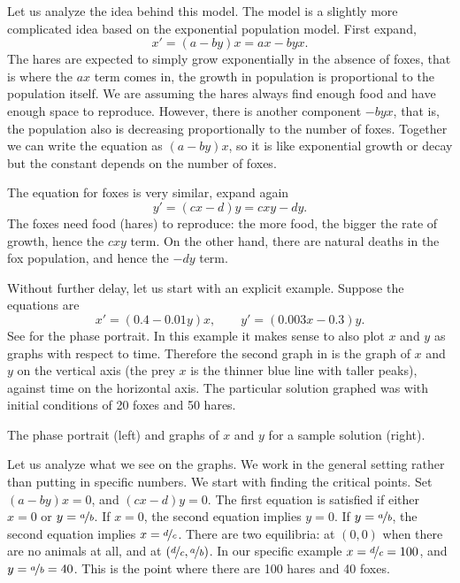 Let us analyze the idea behind this model.  The model is a slightly more
complicated idea based on the exponential population model.
First expand,
\begin{equation*}
x' = (a-by)x = ax - byx .
\end{equation*}
The hares are expected to simply grow exponentially in the absence of foxes,
that is where the $ax$ term comes in, the growth in population is
proportional to the population itself.  We are assuming the hares
always find enough food and have enough space to reproduce.  However,
there is another component $-byx$, that is, the population also is
decreasing proportionally to the number of foxes.  Together we can write the
equation as $(a-by)x$, so it is like exponential growth or decay but the
constant depends on the number of foxes.

The equation for foxes is very similar, expand again
\begin{equation*}
y' = (cx-d)y = cxy-dy .
\end{equation*}
The foxes need food (hares) to reproduce: the more food, the bigger the
rate of growth, hence the $cxy$ term.  On the other hand, there are 
natural deaths in the fox population, and hence the $-dy$ term.

Without further delay, let us start with an explicit example.  Suppose the
equations are 
\begin{equation*}
x' = (0.4-0.01y)x, \qquad y' = (0.003x-0.3)y .
\end{equation*}
See  for the phase portrait.  In this example
it makes sense to also plot $x$ and $y$ as graphs with respect to time.
Therefore the second graph in 
 is the graph of $x$ and $y$ on the vertical
axis (the prey $x$ is the thinner blue line with taller peaks), against time
on the horizontal axis.  The particular solution graphed was with initial
conditions of 20 foxes and 50 hares.
\begin{myfig}
\capstart
\caption{The phase portrait (left) and graphs of $x$ and $y$ for
a sample solution (right). \label{fig:nlin-pred-prey}}
\end{myfig}

Let us analyze what we see on the graphs.  We work in the general
setting rather than putting in specific numbers.  We start with finding
the critical points.  Set $(a-by)x = 0$, and $(cx-d)y = 0$.
The first equation is satisfied if either $x=0$ or $y=\nicefrac{a}{b}$.  If $x=0$, the
second equation implies $y=0$.  If $y= \nicefrac{a}{b}$, the second equation implies
$x=\nicefrac{d}{c}$.
There are two equilibria: at $(0,0)$ when there are no animals at all, and at
$(\nicefrac{d}{c},\nicefrac{a}{b})$.  
In our specific example $x = \nicefrac{d}{c} = 100$, and $y = \nicefrac{a}{b} = 40$.
This is the point where there are 100 hares and 40 foxes.

